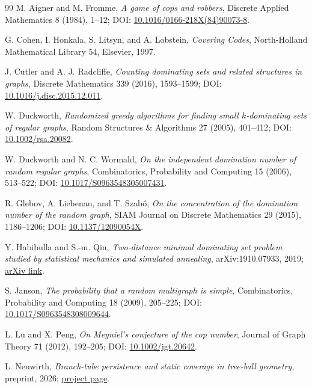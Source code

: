 \documentclass[11pt]{amsart}
\theoremstyle{definition}
\begin{document}
\begin{thebibliography}{99}
M. Aigner and M. Fromme,
\emph{A game of cops and robbers},
Discrete Applied Mathematics 8 (1984), 1--12; DOI: \href{https://doi.org/10.1016/0166-218X(84)90073-8}{10.1016/0166-218X(84)90073-8}.

G. Cohen, I. Honkala, S. Litsyn, and A. Lobstein,
\emph{Covering Codes},
North-Holland Mathematical Library 54, Elsevier, 1997.

J. Cutler and A. J. Radcliffe,
\emph{Counting dominating sets and related structures in graphs},
Discrete Mathematics 339 (2016), 1593--1599; DOI: \href{https://doi.org/10.1016/j.disc.2015.12.011}{10.1016/j.disc.2015.12.011}.

W. Duckworth,
\emph{Randomized greedy algorithms for finding small $k$-dominating sets of regular graphs},
Random Structures \& Algorithms 27 (2005), 401--412; DOI: \href{https://doi.org/10.1002/rsa.20082}{10.1002/rsa.20082}.

W. Duckworth and N. C. Wormald,
\emph{On the independent domination number of random regular graphs},
Combinatorics, Probability and Computing 15 (2006), 513--522; DOI: \href{https://doi.org/10.1017/S0963548305007431}{10.1017/S0963548305007431}.

R. Glebov, A. Liebenau, and T. Szab\'o,
\emph{On the concentration of the domination number of the random graph},
SIAM Journal on Discrete Mathematics 29 (2015), 1186--1206; DOI: \href{https://doi.org/10.1137/12090054X}{10.1137/12090054X}.

Y. Habibulla and S.-m. Qin,
\emph{Two-distance minimal dominating set problem studied by statistical mechanics and simulated annealing},
arXiv:1910.07933, 2019; \href{https://arxiv.org/abs/1910.07933}{arXiv link}.

S. Janson,
\emph{The probability that a random multigraph is simple},
Combinatorics, Probability and Computing 18 (2009), 205--225; DOI: \href{https://doi.org/10.1017/S0963548308009644}{10.1017/S0963548308009644}.

L. Lu and X. Peng,
\emph{On Meyniel's conjecture of the cop number},
Journal of Graph Theory 71 (2012), 192--205; DOI: \href{https://doi.org/10.1002/jgt.20642}{10.1002/jgt.20642}.

L. Neuwirth,
\emph{Branch-tube persistence and static coverage in tree-ball geometry},
preprint, 2026; \href{https://levineuwirth.org/essays/branch-based-local-capture-in-tree-balls/}{project page}.


\end{thebibliography}
\end{document}
